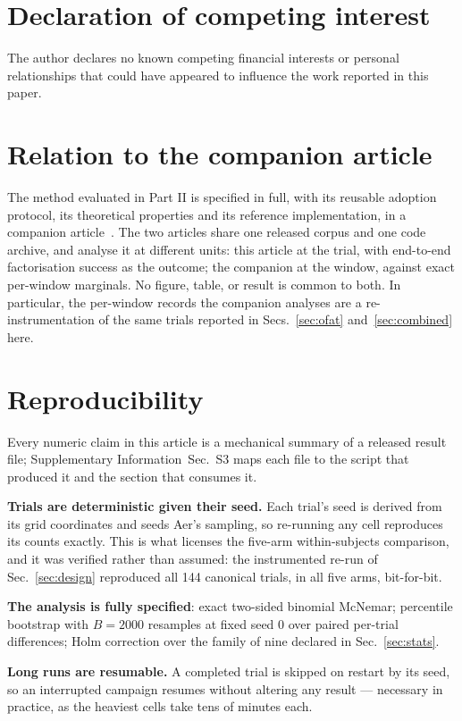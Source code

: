 \documentclass[preprint,11pt]{elsarticle}
\newcommand{\SI}{Supplementary Information}
\newcommand{\SIartifacts}{\SI{}~Sec.~S3}
\begin{document}
\section*{Declaration of competing interest}
The author declares no known competing financial interests or personal
relationships that could have appeared to influence the work reported in
this paper.

\section*{Relation to the companion article}
The method evaluated in Part II is specified in full, with its reusable
adoption protocol, its theoretical properties and its reference
implementation, in a companion article~\cite{methodpaper}. The two articles
share one released corpus and one code archive, and analyse it at different
units: this article at the trial, with end-to-end factorisation success as
the outcome; the companion at the window, against exact per-window
marginals. No figure, table, or result is common to both. In particular, the
per-window records the companion analyses are a re-instrumentation of the
same trials reported in Secs.~\ref{sec:ofat} and~\ref{sec:combined} here.

\section*{Reproducibility}

Every numeric claim in this article is a mechanical summary of a released
result file; \SIartifacts{} maps each file to the script that produced it
and the section that consumes it.

\textbf{Trials are deterministic given their seed.} Each trial's seed is
derived from its grid coordinates and seeds Aer's sampling, so re-running
any cell reproduces its counts exactly. This is what licenses the five-arm
within-subjects comparison, and it was verified rather than assumed: the
instrumented re-run of Sec.~\ref{sec:design} reproduced all 144 canonical
trials, in all five arms, bit-for-bit.

\textbf{The analysis is fully specified}: exact two-sided binomial McNemar;
percentile bootstrap with $B=2000$ resamples at fixed seed 0 over paired
per-trial differences; Holm correction over the family of nine declared in
Sec.~\ref{sec:stats}.

\textbf{Long runs are resumable.} A completed trial is skipped on restart by
its seed, so an interrupted campaign resumes without altering any result ---
necessary in practice, as the heaviest cells take tens of minutes each.
\end{document}
